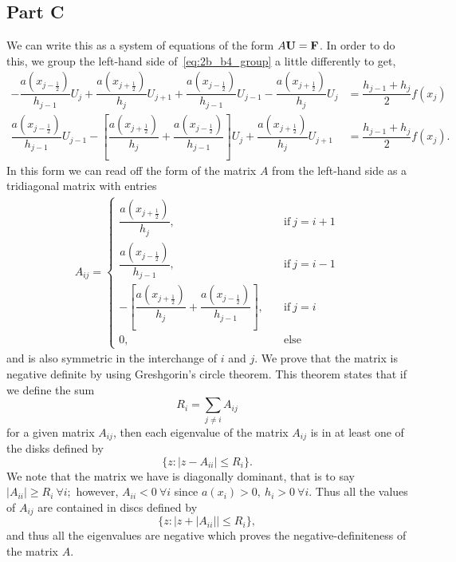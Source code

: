\documentclass[12pt]{article}
\begin{document}
\subsection*{Part C}
We can write this as a system of equations of the form $A\vb{U}=\vb{F}$. In order to do this, we group the left-hand side of~\eqref{eq:2b_b4_group} a little differently to get,
\begin{subequations}
    \begin{align}
    -\dfrac{a\left(x_{j-\frac{1}{2}}\right)}{h_{j-1}}U_{j}
    +\dfrac{a\left(x_{j+\frac{1}{2}}\right)}{h_{j}}U_{j+1}
    +\dfrac{a\left(x_{j-\frac{1}{2}}\right)}{h_{j-1}}U_{j-1}
    -\dfrac{a\left(x_{j+\frac{1}{2}}\right)}{h_{j}}U_{j} &= \dfrac{h_{j-1}+h_{j}}{2} f(x_{j})\\
    \dfrac{a\left(x_{j-\frac{1}{2}}\right)}{h_{j-1}}U_{j-1}
    -\left[\dfrac{a\left(x_{j+\frac{1}{2}}\right)}{h_{j}}+\dfrac{a\left(x_{j-\frac{1}{2}}\right)}{h_{j-1}}\right]U_{j}
    +\dfrac{a\left(x_{j+\frac{1}{2}}\right)}{h_{j}}U_{j+1}
    &= \dfrac{h_{j-1}+h_{j}}{2} f(x_{j}).
    \end{align}
\end{subequations}
In this form we can read off the form of the matrix $A$ from the left-hand side as a tridiagonal matrix with entries
\begin{align}
    A_{ij} =
    \begin{cases}
        \dfrac{a\left(x_{j+\frac{1}{2}}\right)}{h_{j}},&\quad\mathrm{if}\ j = i+1\\
        \dfrac{a\left(x_{j-\frac{1}{2}}\right)}{h_{j-1}},&\quad\mathrm{if}\ j = i-1\\
        -\left[\dfrac{a\left(x_{j+\frac{1}{2}}\right)}{h_{j}}+\dfrac{a\left(x_{j-\frac{1}{2}}\right)}{h_{j-1}}\right], &\quad \mathrm{if}\ j = i\\
        0,&\quad \mathrm{else}
    \end{cases}
\end{align}
and is also symmetric in the interchange of $i$ and $j$. We prove that the matrix is negative definite by using Greshgorin's circle theorem.
This theorem states that if we define the sum \[R_{i} = \sum\limits_{j\neq i} A_{ij}\] for a given matrix $A_{ij}$, then each eigenvalue of the matrix $A_{ij}$ is in at least one of the disks defined by \[\{z : |z-A_{ii}|\le R_{i}\}.\] We note that the matrix we have is diagonally dominant, that is to say $|A_{ii}| \ge R_{i}\ \forall i;$ however, $A_{ii} < 0\ \forall i$ since $a(x_{i}) > 0,\ h_{i} > 0\ \forall i$. Thus all the values of $A_{ij}$ are contained in discs defined by \[\{z : |z+|A_{ii}||\le R_{i}\},\] and thus all the eigenvalues are negative which proves the negative-definiteness of the matrix $A$.
\end{document}
